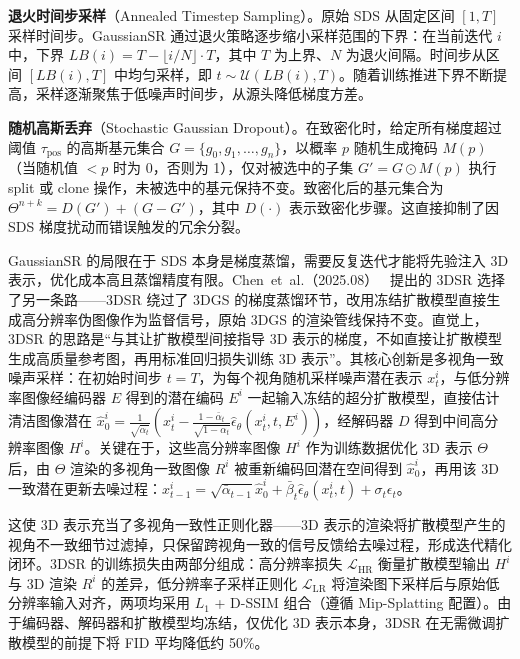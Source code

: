 \textbf{退火时间步采样}（Annealed Timestep Sampling）。原始 SDS 从固定区间 $[1, T]$ 采样时间步。GaussianSR 通过退火策略逐步缩小采样范围的下界：在当前迭代 $i$ 中，下界 $LB(i) = T - \lfloor i / N \rfloor \cdot T$，其中 $T$ 为上界、$N$ 为退火间隔。时间步从区间 $[LB(i), T]$ 中均匀采样，即 $t \sim \mathcal{U}(LB(i), T)$。随着训练推进下界不断提高，采样逐渐聚焦于低噪声时间步，从源头降低梯度方差。

\textbf{随机高斯丢弃}（Stochastic Gaussian Dropout）。在致密化时，给定所有梯度超过阈值 $\tau_{\text{pos}}$ 的高斯基元集合 $G = \{g_0, g_1, \ldots, g_n\}$，以概率 $p$ 随机生成掩码 $M(p)$（当随机值 $< p$ 时为 0，否则为 1），仅对被选中的子集 $G' = G \odot M(p)$ 执行 split 或 clone 操作，未被选中的基元保持不变。致密化后的基元集合为 $\Theta^{n+k} = D(G') + (G - G')$，其中 $D(\cdot)$ 表示致密化步骤。这直接抑制了因 SDS 梯度扰动而错误触发的冗余分裂。

GaussianSR 的局限在于 SDS 本身是梯度蒸馏，需要反复迭代才能将先验注入 3D 表示，优化成本高且蒸馏精度有限。Chen~et~al.（2025.08）~\cite{2508_04090} 提出的 3DSR 选择了另一条路——3DSR 绕过了 3DGS 的梯度蒸馏环节，改用冻结扩散模型直接生成高分辨率伪图像作为监督信号，原始 3DGS 的渲染管线保持不变。直觉上，3DSR 的思路是“与其让扩散模型间接指导 3D 表示的梯度，不如直接让扩散模型生成高质量参考图，再用标准回归损失训练 3D 表示”。其核心创新是多视角一致噪声采样：在初始时间步 $t=T$，为每个视角随机采样噪声潜在表示 $x_t^i$，与低分辨率图像经编码器 $E$ 得到的潜在编码 $E^i$ 一起输入冻结的超分扩散模型，直接估计清洁图像潜在 $\hat{x}_0^i = \frac{1}{\sqrt{\bar{\alpha}_t}}(x_t^i - \frac{1-\bar{\alpha}_t}{\sqrt{1-\bar{\alpha}_t}}\hat{\epsilon}_\theta(x_t^i, t, E^i))$，经解码器 $D$ 得到中间高分辨率图像 $H^i$。关键在于，这些高分辨率图像 $H^i$ 作为训练数据优化 3D 表示 $\Theta$ 后，由 $\Theta$ 渲染的多视角一致图像 $R^i$ 被重新编码回潜在空间得到 $\hat{x}_0^i$，再用该 3D 一致潜在更新去噪过程：$x_{t-1}^i = \sqrt{\bar{\alpha}_{t-1}}\hat{x}_0^i + \bar{\beta}_t \hat{\epsilon}_\theta(x_t^i, t) + \sigma_t \epsilon_t$。

这使 3D 表示充当了多视角一致性正则化器——3D 表示的渲染将扩散模型产生的视角不一致细节过滤掉，只保留跨视角一致的信号反馈给去噪过程，形成迭代精化闭环。3DSR 的训练损失由两部分组成：高分辨率损失 $\mathcal{L}_{\text{HR}}$ 衡量扩散模型输出 $H^i$ 与 3D 渲染 $R^i$ 的差异，低分辨率子采样正则化 $\mathcal{L}_{\text{LR}}$ 将渲染图下采样后与原始低分辨率输入对齐，两项均采用 $L_1$ + D-SSIM 组合（遵循 Mip-Splatting 配置）。由于编码器、解码器和扩散模型均冻结，仅优化 3D 表示本身，3DSR 在无需微调扩散模型的前提下将 FID 平均降低约 50\%。

